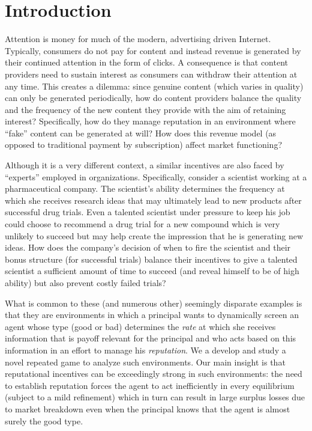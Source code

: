 \documentclass[11pt,reqno]{amsart}
\begin{document}
\maketitle

\section{Introduction}\label{sec:intro}

Attention is money for much of the modern, advertising driven Internet. Typically, consumers do not pay for content and instead revenue is generated by their continued attention in the form of clicks. A consequence is that content providers need to sustain interest as consumers can withdraw their attention at any time. This creates a dilemma: since genuine content (which varies in quality) can only be generated periodically, how do content providers balance the quality and the frequency of the new content they provide with the aim of retaining interest? Specifically, how do they manage reputation in an environment where ``fake'' content can be generated at will? How does this revenue model (as opposed to traditional payment by subscription) affect market functioning?

Although it is a very different context, a similar incentives are also faced by ``experts'' employed in organizations. Specifically, consider a scientist working at a pharmaceutical company. The scientist's ability determines the frequency at which she receives research ideas that may ultimately lead to new products after successful drug trials. Even a talented scientist under pressure to keep his job could choose to recommend a drug trial for a new compound which is very unlikely to succeed but may help create the impression that he is generating new ideas. How does the company's decision of when to fire the scientist and their bonus structure (for successful trials) balance their incentives to give a talented scientist a sufficient amount of time to succeed (and reveal himself to be of high ability) but also prevent costly failed trials?

What is common to these (and numerous other) seemingly disparate examples is that they are environments in which a principal wants to dynamically screen an agent whose type (good or bad) determines the \emph{rate} at which she receives information that is payoff relevant for the principal and who acts based on this information in an effort to manage his \textit{reputation}. We a develop and study a novel repeated game to analyze such environments. Our main insight is that reputational incentives can be exceedingly strong in such environments: the need to establish reputation forces the agent to act inefficiently in every equilibrium (subject to a mild refinement) which in turn can result in large surplus losses due to market breakdown even when the principal knows that the agent is almost surely the good type.
\end{document}

